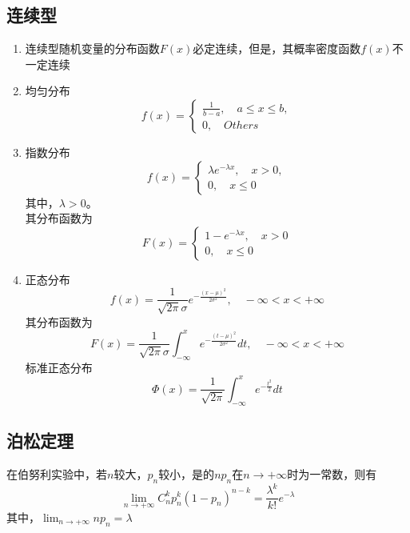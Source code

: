 \subsection{连续型}
\begin{enumerate}
	\item 连续型随机变量的分布函数$F(x)$必定连续，但是，其概率密度函数$f(x)$不一定连续
	\item 均匀分布
	\[ f(x)=\begin{cases}
	\frac{1}{b-a}, \quad a \leq x \leq b, \\
	0, \quad Others
	\end{cases} \]

	\item 指数分布
	\[ f(x)=\begin{cases}
	\lambda e^{-\lambda x}, \quad x>0, \\
	0, \quad x \leq 0
	\end{cases} \]
	其中，$\lambda>0$。 \\
	其分布函数为
	\[ F(x)=\begin{cases}
	1-e^{-\lambda x}, \quad x>0 \\
	0, \quad x \leq 0
	\end{cases} \]

	\item 正态分布
	\begin{equation}
		f(x) = \frac{1}{\sqrt{2\pi} \sigma}e^{-\frac{(x-\mu)^2}{2\sigma^2}}, \quad -\infty < x < +\infty
	\end{equation}
	其分布函数为
	\begin{equation}
		F(x) = \frac{1}{\sqrt{2\pi}\sigma} \int_{-\infty}^x  e^{-\frac{(t-\mu)^2}{2\sigma^2}} dt, \quad -\infty < x < +\infty
	\end{equation}
	标准正态分布
	\begin{equation}
		\Phi(x) = \frac{1}{\sqrt{2\pi}} \int_{-\infty}^x e^{-\frac{t^2}{2}} dt
	\end{equation}

\end{enumerate}

\subsection{泊松定理}
在伯努利实验中，若$n$较大，$p_n$较小，是的$np_n$在$n \to +\infty$时为一常数，则有
\begin{equation}
	\lim_{n \to +\infty}C_n^kp_n^k(1-p_n)^{n-k} = \frac{\lambda ^k}{k!}e^{-\lambda}
\end{equation}
其中，$\lim_{n\to+\infty}np_n = \lambda$






